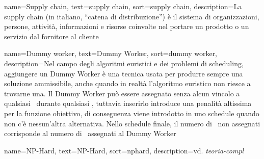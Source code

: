 {
    name=Supply chain,
    text=supply chain,
    sort=supply chain,
    description={La supply chain (in italiano, ``catena di distribuzione'') è il sistema di organizzazioni, persone, attività, informazioni e risorse coinvolte nel portare un prodotto o un servizio dal fornitore al cliente}
}

{
    name=Dummy worker,
    text=Dummy Worker,
    sort=dummy worker,
    description={Nel campo degli algoritmi euristici e dei problemi di scheduling, aggiungere un Dummy Worker è una tecnica usata per produrre sempre una soluzione ammissibile, anche quando in realtà l'algoritmo euristico non riesce a trovarne una. Il Dummy Worker può essere assegnato senza alcun vincolo a qualsiasi \task\ durante qualsiasi \ttb, tuttavia inserirlo introduce una penalità altissima per la funzione obiettivo, di conseguenza viene introdotto in uno schedule quando non c'è nessun'altra alternativa. Nello schedule finale, il numero di \task\ non assegnati corrisponde al numero di \task\ assegnati al Dummy Worker}
}


{
    name=NP-Hard,
    text=NP-Hard,
    sort=nphard,
    description={vd. \emph{\gls{teoria-compl}}\glsfirstoccur}
}

